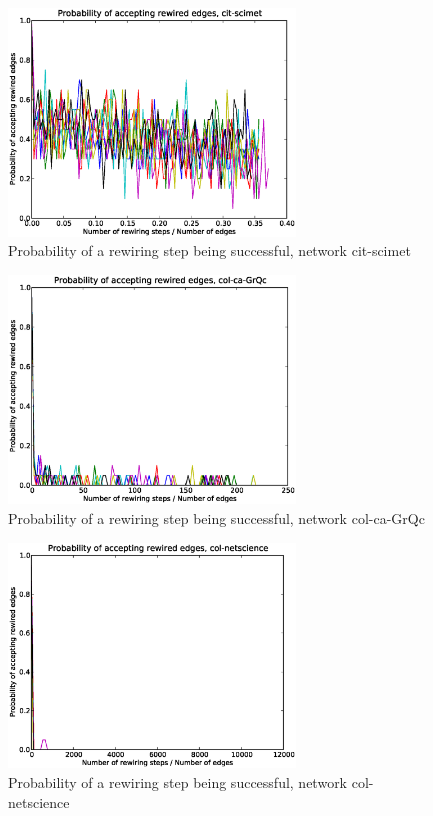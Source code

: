 \begin{figure}[p]
\centering
\includegraphics[width=3in]{Figures/Paccept-cit-scimet.eps}
\caption{Probability of a rewiring step being successful, network cit-scimet}
\label{fig:Paccept-cit-scimet}
\end{figure}

\begin{figure}[p]
\centering
\includegraphics[width=3in]{Figures/Paccept-col-ca-GrQc.eps}
\caption{Probability of a rewiring step being successful, network col-ca-GrQc}
\label{fig:Paccept-col-ca-GrQc}
\end{figure}

\begin{figure}[p]
\centering
\includegraphics[width=3in]{Figures/Paccept-col-netscience.eps}
\caption{Probability of a rewiring step being successful, network col-netscience}
\label{fig:Paccept-col-netscience}
\end{figure}

